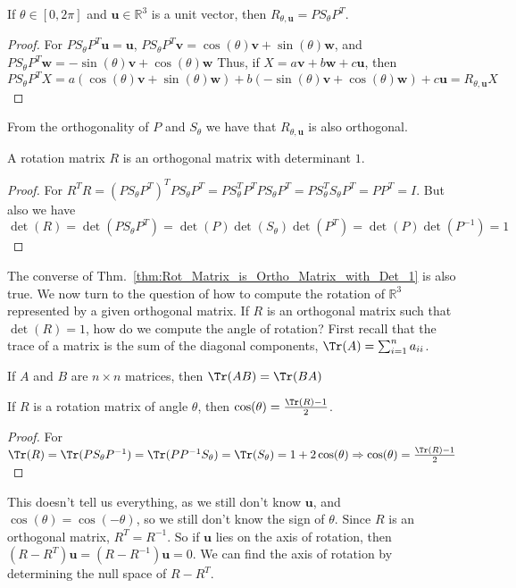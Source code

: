     \begin{theorem}
    If $\theta \in [0,2\pi]$ and $\mathbf{u}\in \mathbb{R}^3$ is a unit vector, then $R_{\theta, \mathbf{u}} = PS_{\theta}P^T$.
    \end{theorem}
    \begin{proof}
    For $PS_{\theta}P^T\mathbf{u}=\mathbf{u}$, $PS_{\theta}P^{T}\mathbf{v}=\cos(\theta)\mathbf{v}+\sin(\theta)\mathbf{w}$, and $PS_{\theta}P^{T}\mathbf{w}=-\sin(\theta)\mathbf{v}+\cos(\theta)\mathbf{w}$
    Thus, if $X = a\mathbf{v}+b\mathbf{w}+c\mathbf{u}$, then $PS_{\theta}P^TX=a(\cos(\theta)\mathbf{v}+\sin(\theta)\mathbf{w})+b(-\sin(\theta)\mathbf{v}+\cos(\theta)\mathbf{w})+c\mathbf{u}=R_{\theta,\mathbf{u}}X$
    \end{proof}
    From the orthogonality of $P$ and $S_{\theta}$ we have that $R_{\theta,\mathbf{u}}$ is also orthogonal.
    \begin{theorem}
    \label{thm:Rot_Matrix_is_Ortho_Matrix_with_Det_1}
    A rotation matrix $R$ is an orthogonal matrix with determinant $1$.
    \end{theorem}
    \begin{proof}
    For $R^{T}R=(PS_{\theta}P^{T})^{T}PS_{\theta}P^{T}=PS_{\theta}^{T}P^{T}PS_{\theta}P^{T}=PS_{\theta}^{T}S_{\theta}P^{T}=PP^{T}=I$. But also we have $\det(R)=\det(PS_{\theta}P^T)=\det(P)\det(S_{\theta})\det(P^T)=\det(P)\det(P^{-1})=1$
    \end{proof}
    The converse of Thm.~\ref{thm:Rot_Matrix_is_Ortho_Matrix_with_Det_1} is
    also true. We now turn to the question of how to compute the rotation of
    $\mathbb{R}^3$ represented by a given orthogonal matrix. If $R$ is an
    orthogonal matrix such that $\det(R)=1$, how do we compute the angle of
    rotation? First recall that the trace of a matrix is the sum of the
    diagonal components, $\Tr(A)=\sum_{i=1}^{n}a_{ii}$.
    \begin{theorem}
    If $A$ and $B$ are $n\times n$ matrices, then $\Tr(AB) = \Tr(BA)$
    \end{theorem}
    \begin{theorem}
    If $R$ is a rotation matrix of angle $\theta$, then $\cos(\theta) = \frac{\Tr(R) - 1}{2}$.
    \end{theorem}
    \begin{proof}
    For $\Tr(R)=\Tr(PS_{\theta}P^{-1})=\Tr(PP^{-1}S_{\theta}) = \Tr(S_{\theta})=1+2\cos(\theta)\Rightarrow \cos(\theta)=\tfrac{\Tr(R)-1}{2}$
    \end{proof}
    This doesn't tell us everything, as we still don't know $\mathbf{u}$, and $\cos(\theta) = \cos(-\theta)$, so we still don't know the sign of $\theta$. Since $R$ is an orthogonal matrix, $R^T = R^{-1}$. So if $\mathbf{u}$ lies on the axis of rotation, then $(R-R^T)\mathbf{u} = (R-R^{-1})\mathbf{u} = 0$. We can find the axis of rotation by determining the null space of $R-R^T$. 
